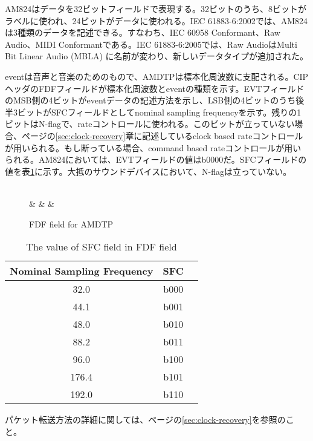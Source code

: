 \documentclass[onecolumn]{jarticle}
\begin{document}
AM824はデータを32ビットフィールドで表現する。32ビットのうち、8ビットがラベルに使われ、24ビットがデータに使われる。IEC 61883-6:2002\cite{iec61883-6-1}では、AM824は3種類のデータを記述できる。すなわち、IEC 60958 Conformant、Raw Audio、MIDI Conformantである。IEC 61883-6:2005\cite{iec61883-6-2}では、Raw AudioはMulti Bit Linear Audio (MBLA) に名前が変わり、新しいデータタイプが追加された。

eventは音声と音楽のためのもので、AMDTPは標本化周波数に支配される。CIPヘッダのFDFフィールドが標本化周波数とeventの種類を示す。EVTフィールドのMSB側の4ビットがeventデータの記述方法を示し、LSB側の4ビットのうち後半3ビットがSFCフィールドとしてnominal sampling frequencyを示す。残りの1ビットはN-flagで、rateコントロールに使われる。このビットが立っていない場合、\pageref{sec:clock-recovery}ページの\ref{sec:clock-recovery}章に記述しているclock based rateコントロールが用いられる。もし断っている場合、command based rateコントロールが用いられる\cite{iec61883-6-2, avc-rate-control}。AM824においては、EVTフィールドの値はb0000だ。SFCフィールドの値を表\ref{tbl:sfc-fdf}に示す。大抵のサウンドデバイスにおいて、N-flagは立っていない。

\begin{figure}[H]
\centering
\begin{bytefield}[bitwidth=auto,endianness=big]{8}
	 \\
	 &
	 &
	 &
\end{bytefield}
\caption{FDF field for AMDTP}
\label{amdtp-fdf}
\end{figure}

\begin{table}[H]
	\centering
	\caption{{The value of SFC field in FDF field}}
	\label{tbl:sfc-fdf}
	\begin{tabular}{ccc} \toprule
		Nominal Sampling Frequency & SFC \\ \midrule
		32.0	& b000 \\
		44.1	& b001 \\
		48.0	& b010 \\
		88.2	& b011 \\
		96.0	& b100 \\
		176.4	& b101 \\
		192.0	& b110 \\ \bottomrule
	\end{tabular}
\end{table}

パケット転送方法の詳細に関しては、\pageref{sec:clock-recovery}ページの\ref{sec:clock-recovery}を参照のこと。
\end{document}
